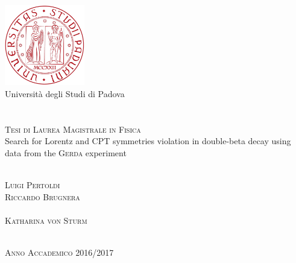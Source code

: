 \documentclass[11pt, a4paper, twoside]{article}
\begin{document}
\begin{titlepage}
	\thispagestyle{empty}
	\begin{center}
	\includegraphics[width=3.5cm]{img/logo.pdf} \\
	\vspace{0.5cm}
	{\Large Universit\`a degli Studi di Padova} \\
	\hrulefill \\
	 \\
	\vspace{2cm}
	\textsc{Tesi di Laurea Magistrale in Fisica} \\
	\vspace{3cm}
	\LARGE{Search for Lorentz and CPT symmetries violation in double-beta decay using data from the \textsc{Gerda} experiment}
	\end{center}
	\vspace{3cm}
	\begin{multicols}{2}
	\noindent
	 \\
	\textsc{Luigi Pertoldi}
	\columnbreak
	\flushright
	 \\
	\textsc{Riccardo Brugnera} \\
	\vspace{5mm}
	 \\
	\textsc{Katharina von Sturm}
	\end{multicols}
	\vspace*{\fill}
	\begin{center}
	\hrulefill \\
	\textsc{Anno Accademico 2016/2017}
	\end{center}
\end{titlepage}
\restoregeometry
\tableofcontents
\listoftables
\listoffigures








\end{document}

